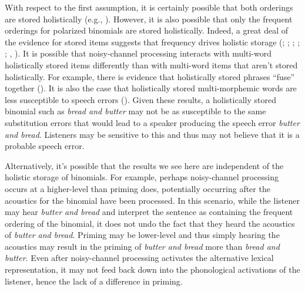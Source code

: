 \documentclass[
  12pt,
]{scrartcl}
\begin{document}
With respect to the first assumption, it is certainly possible that both
orderings are stored holistically (e.g.,
).
However, it is also possible that only the frequent orderings for
polarized binomials are stored holistically. Indeed, a great deal of the
evidence for stored items suggests that frequency drives holistic
storage (; ;
;
;
; , ).
It is possible that noisy-channel processing interacts with multi-word
holistically stored items differently than with multi-word items that
aren't stored holistically. For example, there is evidence that
holistically stored phrases ``fuse'' together
(). It is also the case that holistically stored
multi-morphemic words are less susceptible to speech errors
(). Given these results, a holistically stored binomial
such as \emph{bread and butter} may not be as susceptible to the same
substitution errors that would lead to a speaker producing the speech
error \emph{butter and bread}. Listeners may be sensitive to this and
thus may not believe that it is a probable speech error.

Alternatively, it's possible that the results we see here are
independent of the holistic storage of binomials. For example, perhaps
noisy-channel processing occurs at a higher-level than priming does,
potentially occurring after the acoustics for the binomial have been
processed. In this scenario, while the listener may hear \emph{butter
and bread} and interpret the sentence as containing the frequent
ordering of the binomial, it does not undo the fact that they heard the
acoustics of \emph{butter and bread}. Priming may be lower-level and
thus simply hearing the acoustics may result in the priming of
\emph{butter and bread} more than \emph{bread and butter}. Even after
noisy-channel processing activates the alternative lexical
representation, it may not feed back down into the phonological
activations of the listener, hence the lack of a difference in priming.
\end{document}
